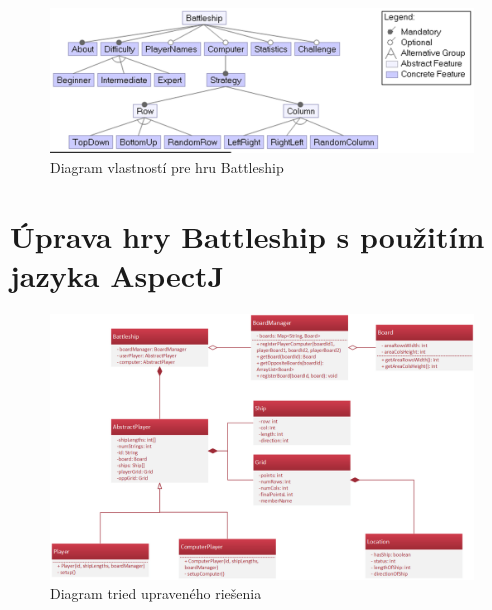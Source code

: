 \documentclass[11pt,slovak,a4paper,twoside]{article}
\begin{document}
\begin{figure}[H]  %
					\begin{center}
									\includegraphics[width=\linewidth]{fig/battleshipFeatureModel.png}
									\caption{Diagram vlastností pre hru Battleship}
									\label{battleshipFeatureModel}
					\end{center}
\end{figure}

\section{Úprava hry Battleship s použitím jazyka AspectJ} \label{analysis}

\begin{figure}[H]  %
					\begin{center}
									\includegraphics[width=\linewidth]{fig/refactoredSchema.png}
									\caption{Diagram tried upraveného riešenia}
									\label{refactoredSchema}
					\end{center}
\end{figure}
\end{document}
